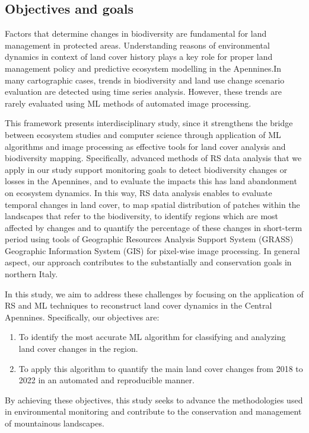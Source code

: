 \documentclass[jimaging,article,submit,pdftex,moreauthors]{Definitions/mdpi}
\begin{document}
\subsection{Objectives and goals}

Factors that determine changes in biodiversity are fundamental for land management in protected areas. Understanding reasons of environmental dynamics in context of land cover history plays a key role for proper land management policy and predictive ecosystem modelling in the Apennines.In many cartographic cases, trends in biodiversity and land use change scenario evaluation are detected using time series analysis. However, these trends are rarely evaluated using ML methods of automated image processing. 

This framework presents interdisciplinary study, since it strengthens the bridge between ecosystem studies and computer science through application of ML algorithms and image processing as effective tools for land cover analysis and biodiversity mapping. Specifically, advanced methods of RS data analysis that we apply in our study support monitoring goals to detect biodiversity changes or losses in the Apennines, and to evaluate the impacts this has land abandonment on ecosystem dynamics. In this way, RS data analysis enables to evaluate temporal changes in land cover, to map spatial distribution of patches within the landscapes that refer to the biodiversity, to identify regions which are most affected by changes and to quantify the percentage of these changes in short-term period using tools of Geographic Resources Analysis Support System (GRASS) Geographic Information System (GIS) for pixel-wise image processing. In general aspect, our approach contributes to the substantially and conservation goals in northern Italy.

In this study, we aim to address these challenges by focusing on the application of RS and ML techniques to reconstruct land cover dynamics in the Central Apennines. Specifically, our objectives are:
\begin{enumerate}
    \item To identify the most accurate ML algorithm for classifying and analyzing land cover changes in the region.
    \item To apply this algorithm to quantify the main land cover changes from 2018 to 2022 in an automated and reproducible manner.
\end{enumerate}
By achieving these objectives, this study seeks to advance the methodologies used in environmental monitoring and contribute to the conservation and management of mountainous landscapes. 
\end{document}
